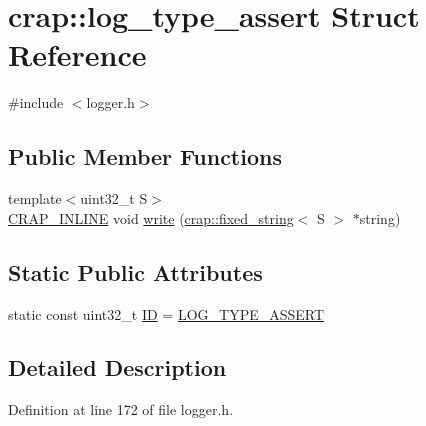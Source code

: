 \hypertarget{structcrap_1_1log__type__assert}{\section{crap\+:\+:log\+\_\+type\+\_\+assert Struct Reference}
\label{structcrap_1_1log__type__assert}
}


{\ttfamily \#include $<$logger.\+h$>$}

\subsection*{Public Member Functions}
\begin{DoxyCompactItemize}
\item 
{\footnotesize template$<$uint32\+\_\+t S$>$ }\\\hyperlink{config__x86_8h_a5a40526b8d842e7ff731509998bb0f1c}{C\+R\+A\+P\+\_\+\+I\+N\+L\+I\+N\+E} void \hyperlink{structcrap_1_1log__type__assert_aca4ccaa24ce56a132349b8752e40f1a9}{write} (\hyperlink{classcrap_1_1fixed__string}{crap\+::fixed\+\_\+string}$<$ S $>$ $\ast$string)
\end{DoxyCompactItemize}
\subsection*{Static Public Attributes}
\begin{DoxyCompactItemize}
\item 
static const uint32\+\_\+t \hyperlink{structcrap_1_1log__type__assert_a8c6abe2c41e9c5a1880d3ce2b317f637}{I\+D} = \hyperlink{logger_8h_a7471e00da55fd22f4789aa4989c4a482}{L\+O\+G\+\_\+\+T\+Y\+P\+E\+\_\+\+A\+S\+S\+E\+R\+T}
\end{DoxyCompactItemize}


\subsection{Detailed Description}


Definition at line 172 of file logger.\+h.



